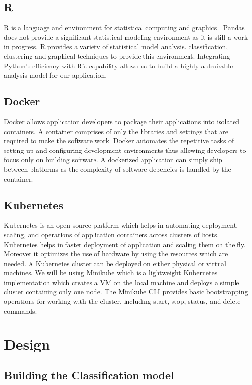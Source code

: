 \documentclass[9pt,twocolumn,twoside]{../../styles/osajnl}
\begin{document}
\subsection{R}
R is a language and environment for statistical computing and graphics
\cite{www-about-rproject}. Pandas does not provide a significant
statistical modeling environment as it is still a work in progress. R
provides a variety of statistical model analysis, classification,
clustering and graphical techniques to provide this
environment. Integrating Python's efficiency with R's capability
allows us to build a highly a desirable analysis model for our
application.

\subsection{Docker}
Docker allows application developers to package their applications
into isolated containers. A container comprises of only the libraries
and settings that are required to make the software work.  Docker
automates the repetitive tasks of setting up and configuring
development environments thus allowing developers to focus only on
building software. A dockerized application
can simply ship between platforms as the complexity of software
depencies is handled by the container.

\subsection{Kubernetes}
Kubernetes is an open-source platform which helps
in automating deployment, scaling, and operations of application
containers across clusters of hosts. Kubernetes helps in faster
deployment of application and scaling them on the fly. Moreover it
optimizes the use of hardware by using the resources which are
needed. A Kubernetes cluster can be deployed on either physical or
virtual machines. We will be using Minikube which is a lightweight
Kubernetes implementation which creates a VM on the local machine and
deploys a simple cluster containing only one node. The Minikube CLI
provides basic bootstrapping operations for working with the cluster,
including start, stop, status, and delete commands.

\section{Design}
\subsection{Building the Classification model}
\end{document}
